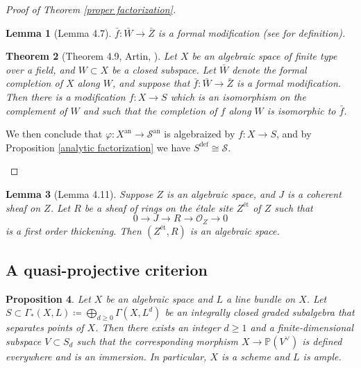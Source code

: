 \documentclass{amsart}
\newtheorem{theorem}{Theorem}[subsection]
\newtheorem{lemma}[theorem]{Lemma}
\newtheorem{proposition}[theorem]{Proposition}
\theoremstyle{definition}
\numberwithin{equation}{section}
\newcommand{\definable}{\mathrm{def}}
\newcommand{\analytic}{\mathrm{an}}
\begin{document}
\begin{proof}[Proof of Theorem \ref{proper factorization}]
\begin{enumerate}
		      \begin{lemma}[Lemma 4.7]
			      $\bar{f}: \bar{W} \to \bar{Z}$ is a formal modification (see \cite[Definition (1.7)]{zbMATH03283964} for definition).
		      \end{lemma}

		      \begin{theorem}[Theorem 4.9, Artin, {\cite[Theorem (3.1)]{zbMATH03283964}}]
			      Let $X$ be an algebraic space of finite type over a field, and $W\subset X$ be a closed subspace.
			      Let $\bar{W}$ denote the formal completion of $X$ along $W$,
			      and suppose that $\bar{f}: \bar{W} \to \bar{Z}$ is a formal modification.
			      Then there is a modification $f:X \to S$ which is an isomorphism on the complement of $W$
			      and such that the completion of $f$ along $W$ is isomorphic to $\bar{f}$.
		      \end{theorem}

		      We then conclude that $\varphi:X^\analytic \to \mathcal{S}^\analytic$ is algebraized by $f: X \to S$,
		      and by Proposition \ref{analytic factorization} we have $S^\definable \cong \mathcal{S}$.
	\end{enumerate}
\end{proof}

\begin{lemma}[Lemma 4.11]
	Suppose $Z$ is an algebraic space,
	and $J$ is a coherent sheaf on $Z$.
	Let $R$ be a sheaf of rings on the {\'e}tale site $Z^{\text{\' et}}$ of $Z$ such that
	\[
		0 \to J \to R \to \mathcal{O}_Z \to 0
	\]
	is a first order thickening.
	Then $(Z^{\text{\'et}},R)$ is an algebraic space.
\end{lemma}

\subsection{A quasi-projective criterion}

\begin{proposition}
	Let $X$ be an algebraic space and $L$ a line bundle on $X$.
	Let $S \subset \Gamma_*(X,L) \coloneq \bigoplus_{d \ge 0} \Gamma(X,L^d)$ be an integrally closed graded subalgebra
	that separates points of $X$.
	Then there exists an integer $d \ge 1$ and a finite-dimensional subspace $V\subset S_d$
	such that the corresponding morphism $X \to \mathbb{P}(V^{\vee})$ is defined everywhere and is an immersion.
	In particular, $X$ is a scheme and $L$ is ample.
\end{proposition}
\end{document}
